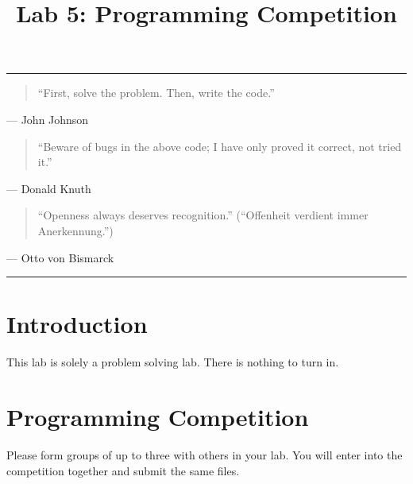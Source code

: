 \documentclass[11pt]{cselabheader}
\title{Lab 5: Programming Competition}
\theoremstyle{plain}
\begin{document}
\maketitle

\hrule

\begin{quotation}
  ``First, solve the problem. Then, write the code.''
\end{quotation}
\begin{flushright}
  --- John Johnson
\end{flushright}

\begin{quotation} ``Beware of bugs in the above code; I have only proved it
  correct, not tried it.''
\end{quotation}
\begin{flushright}
  --- Donald Knuth
\end{flushright}

\begin{quotation}
  ``Openness always deserves recognition.'' (``Offenheit verdient immer
  Anerkennung.'')
\end{quotation}
\begin{flushright}
  --- Otto von Bismarck

\end{flushright}

\hrule

\pagebreak

\section{Introduction}
This lab is solely a problem solving lab. There is nothing to turn in.

\section{Programming Competition}
Please form groups of up to three with others in your lab. You will
enter into the competition together and submit the same files.
\end{document}
